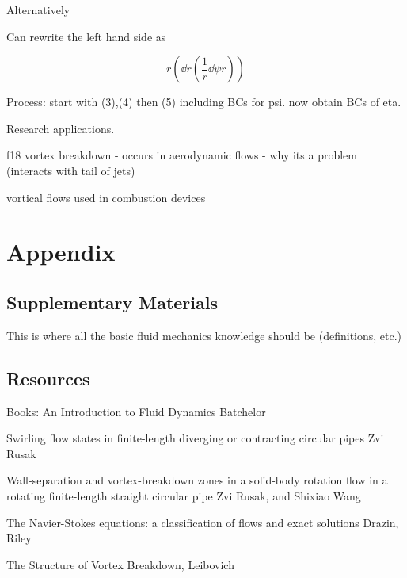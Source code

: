 \documentclass{X:/Documents/Coding/Latex/myreport}
\begin{document}
Alternatively


Can rewrite the left hand side as

\[r\left(\dd{}r \left(\frac1r \dd\psi r\right)\right)\]





Process: start with (3),(4) then (5) including BCs for psi. now obtain BCs of eta.

Research applications.

f18 vortex breakdown - occurs in aerodynamic flows - why its a problem (interacts with tail of jets)

vortical flows used in combustion devices


\clearpage
\section{Appendix}
\subsection{Supplementary Materials}
This is where all the basic fluid mechanics knowledge should be (definitions, etc.)

\subsection{Resources}
Books:
An Introduction to Fluid Dynamics
Batchelor

Swirling flow states in finite-length diverging or contracting circular pipes
Zvi Rusak


Wall-separation and vortex-breakdown zones in a solid-body rotation flow in a rotating finite-length straight circular pipe
Zvi Rusak, and Shixiao Wang

The Navier-Stokes equations: a classification of flows and exact solutions
Drazin, Riley


The Structure of Vortex Breakdown, 
Leibovich
\end{document}

